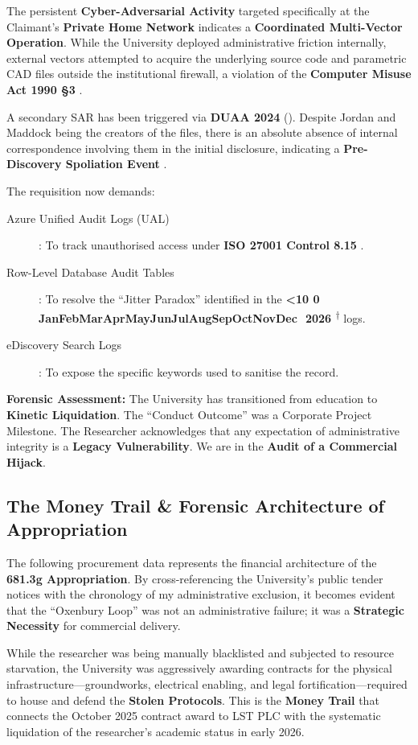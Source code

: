 \documentclass{EMBASSY}
\DeclareRobustCommand{\gmt}[3]{%
    \texorpdfstring{%
        {\color{DateGold}\textbf{%
            \ifnum#1<10 0\fi#1\,\textperiodcentered\,%
            \ifcase#2\or Jan\or Feb\or Mar\or Apr\or May\or Jun\or Jul\or Aug\or Sep\or Oct\or Nov\or Dec\fi
            \,\textperiodcentered\,20#3%
            \textsuperscript{$\dagger$}%
        }}%
    }{%
        (#1/#2/#3)%
    }%
}
\begin{document}
The persistent \textbf{Cyber-Adversarial Activity} targeted specifically at the Claimant's \textbf{Private Home Network} indicates a \textbf{Coordinated Multi-Vector Operation}. While the University deployed administrative friction internally, external vectors attempted to acquire the underlying source code and parametric CAD files outside the institutional firewall, a violation of the \textbf{Computer Misuse Act 1990 \S3} \cite{CMA90}.

\dinkus

\noindent A secondary SAR has been triggered via \textbf{DUAA 2024} (\cite{DUAA24}). Despite Jordan and Maddock being the creators of the files, there is an absolute absence of internal correspondence involving them in the initial disclosure, indicating a \textbf{Pre-Discovery Spoliation Event} \cite{FOIA00}.

The requisition now demands:

\begin{description}
	\item[Azure Unified Audit Logs (UAL)]: To track unauthorised access under \textbf{ISO 27001 Control 8.15} \cite{ISO27001-Audit}.
	\item[Row-Level Database Audit Tables]: To resolve the ``Jitter Paradox'' identified in the \gmt{22}{1}{26} logs.
	\item[eDiscovery Search Logs]: To expose the specific keywords used to sanitise the record.
\end{description}

\noindent\textbf{Forensic Assessment:} The University has transitioned from education to \textbf{Kinetic Liquidation}. The ``Conduct Outcome'' was a Corporate Project Milestone. The Researcher acknowledges that any expectation of administrative integrity is a \textbf{Legacy Vulnerability}. We are in the \textbf{Audit of a Commercial Hijack}.

\subsection{The Money Trail \& Forensic Architecture of Appropriation}
The following procurement data represents the financial architecture of the \textbf{681.3g Appropriation}. By cross-referencing the University’s public tender notices with the chronology of my administrative exclusion, it becomes evident that the ``Oxenbury Loop'' was not an administrative failure; it was a \textbf{Strategic Necessity} for commercial delivery.

While the researcher was being manually blacklisted and subjected to resource starvation, the University was aggressively awarding contracts for the physical infrastructure---groundworks, electrical enabling, and legal fortification---required to house and defend the \textbf{Stolen Protocols}. This is the \textbf{Money Trail} that connects the October 2025 contract award to LST PLC with the systematic liquidation of the researcher's academic status in early 2026.
\end{document}
